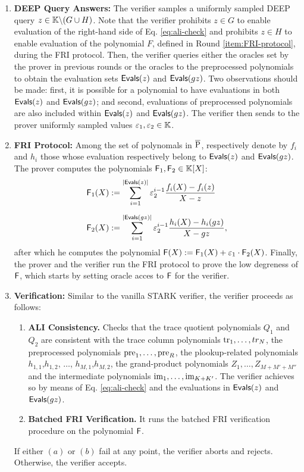 \begin{protocol}
\begin{enumerate}
  \item \textbf{DEEP Query Answers:} The verifier samples a uniformly sampled DEEP query $z \in \mathbb{K} \backslash (G \cup H)$. Note that the verifier prohibits $z \in G$ to enable evaluation of the right-hand side of Eq. \eqref{eq:ali-check} and prohibits $z \in H$ to enable evaluation of the polynomial $F$, defined in Round \ref{item:FRI-protocol}, during the FRI protocol.
  Then, the verifier queries either the oracles set by the prover in previous rounds or the oracles to the preprocessed polynomials to obtain the evaluation sets $\textsf{Evals}(z)$ and $\textsf{Evals}(gz)$. Two observations should be made: first, it is possible for a polynomial to have evaluations in both $\textsf{Evals}(z)$ and $\textsf{Evals}(gz)$; and second, evaluations of preprocessed polynomials are also included within $\textsf{Evals}(z)$ and $\textsf{Evals}(gz)$. The verifier then sends to the prover uniformly sampled values $\varepsilon_1,\varepsilon_2 \in \mathbb{K}$.
  
  \item \textbf{FRI Protocol:} Among the set of polynomals in $\overline{\text{P}}$, respectively denote by $f_i$ and $h_i$ those whose evaluation respectively belong to $\textsf{Evals}(z)$ and $\textsf{Evals}(gz)$. The prover computes the polynomials $\textsf{F}_1,\textsf{F}_2 \in \mathbb{K}[X]$:
  \begin{align*}
    \textsf{F}_1(X) &:= \sum_{i = 1}^{|\textsf{Evals}(z)|} \varepsilon_2^{i-1} \frac{f_i(X) - f_i(z)}{X-z} \\[0.2cm]
    \textsf{F}_2(X) &:= \sum_{i = 1}^{|\textsf{Evals}(gz)|} \varepsilon_2^{i-1} \frac{h_i(X) - h_i(gz)}{X-gz},
  \end{align*}
  after which he computes the polynomial $\textsf{F}(X) := \textsf{F}_1(X) + \varepsilon_1 \cdot \textsf{F}_2(X)$. Finally, the prover and the verifier run the FRI protocol to prove the low degreness of $\textsf{F}$, which starts by setting oracle acces to $\textsf{F}$ for the verifier. \label{item:FRI-protocol}

  \item \textbf{Verification:} Similar to the vanilla STARK verifier, the verifier proceeds as follows:
  \begin{enumerate}
    \item \textbf{ALI Consistency.} Checks that the trace quotient polynomials $Q_1$ and $Q_2$ are consistent with the trace column polynomials $\text{tr}_1,\dots,tr_N$, the preprocessed polynomials $\text{pre}_1,\dots,\text{pre}_R$, the plookup-related polynomials $h_{1,1}$,$h_{1,2}$, $\dots$, $h_{M,1}$,$h_{M,2}$, the grand-product polynomials $Z_1, \dots, Z_{M+M'+M''}$ and the intermediate polynomials $\text{im}_1,\dots,\text{im}_{K+K'}$. The verifier achieves so by means of Eq. \eqref{eq:ali-check} and the evaluations in $\textsf{Evals}(z)$ and $\textsf{Evals}(gz)$.
    \item \textbf{Batched FRI Verification.} It runs the batched FRI verification procedure on the polynomial $\textsf{F}$.
  \end{enumerate}
  
  If either $(a)$ or $(b)$ fail at any point, the verifier aborts and rejects. Otherwise, the verifier accepts.
\end{enumerate}
\end{protocol}





